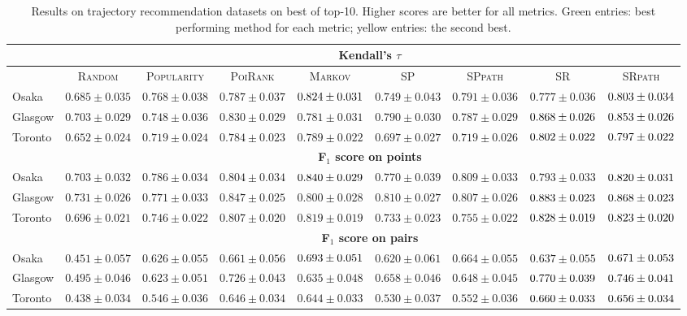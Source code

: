 \begin{table*}[t]
{%
\begin{tabular}{l|cc|ccc|ccc} \hline
& \multicolumn{8}{c}{\bf Kendall's $\tau$} \\ \hline
 & \textsc{Random} & \textsc{Popularity} & \textsc{PoiRank} & \textsc{Markov} & \textsc{SP} & \textsc{SPpath} & \textsc{SR} & \textsc{SRpath} \\ \hline
Osaka & $0.685\pm0.035$ & $0.768\pm0.038$ & $0.787\pm0.037$ & $\cellcolor{green!25}{0.824\pm0.031}$ & $0.749\pm0.043$ & $0.791\pm0.036$ & $0.777\pm0.036$ & $\cellcolor{yellow!25}{0.803\pm0.034}$ \\
Glasgow & $0.703\pm0.029$ & $0.748\pm0.036$ & $0.830\pm0.029$ & $0.781\pm0.031$ & $0.790\pm0.030$ & $0.787\pm0.029$ & $\cellcolor{green!25}{0.868\pm0.026}$ & $\cellcolor{yellow!25}{0.853\pm0.026}$ \\
Toronto & $0.652\pm0.024$ & $0.719\pm0.024$ & $0.784\pm0.023$ & $0.789\pm0.022$ & $0.697\pm0.027$ & $0.719\pm0.026$ & $\cellcolor{green!25}{0.802\pm0.022}$ & $\cellcolor{yellow!25}{0.797\pm0.022}$ \\
\hline
& \multicolumn{8}{c}{\bf F$_1$ score on points} \\ \hline
Osaka & $0.703\pm0.032$ & $0.786\pm0.034$ & $0.804\pm0.034$ & $\cellcolor{green!25}{0.840\pm0.029}$ & $0.770\pm0.039$ & $0.809\pm0.033$ & $0.793\pm0.033$ & $\cellcolor{yellow!25}{0.820\pm0.031}$ \\
Glasgow & $0.731\pm0.026$ & $0.771\pm0.033$ & $0.847\pm0.025$ & $0.800\pm0.028$ & $0.810\pm0.027$ & $0.807\pm0.026$ & $\cellcolor{green!25}{0.883\pm0.023}$ & $\cellcolor{yellow!25}{0.868\pm0.023}$ \\
Toronto & $0.696\pm0.021$ & $0.746\pm0.022$ & $0.807\pm0.020$ & $0.819\pm0.019$ & $0.733\pm0.023$ & $0.755\pm0.022$ & $\cellcolor{green!25}{0.828\pm0.019}$ & $\cellcolor{yellow!25}{0.823\pm0.020}$ \\
\hline
& \multicolumn{8}{c}{\bf F$_1$ score on pairs} \\ \hline
Osaka & $0.451\pm0.057$ & $0.626\pm0.055$ & $0.661\pm0.056$ & $\cellcolor{green!25}{0.693\pm0.051}$ & $0.620\pm0.061$ & $0.664\pm0.055$ & $0.637\pm0.055$ & $\cellcolor{yellow!25}{0.671\pm0.053}$ \\
Glasgow & $0.495\pm0.046$ & $0.623\pm0.051$ & $0.726\pm0.043$ & $0.635\pm0.048$ & $0.658\pm0.046$ & $0.648\pm0.045$ & $\cellcolor{green!25}{0.770\pm0.039}$ & $\cellcolor{yellow!25}{0.746\pm0.041}$ \\
Toronto & $0.438\pm0.034$ & $0.546\pm0.036$ & $0.646\pm0.034$ & $0.644\pm0.033$ & $0.530\pm0.037$ & $0.552\pm0.036$ & $\cellcolor{green!25}{0.660\pm0.033}$ & $\cellcolor{yellow!25}{0.656\pm0.034}$ \\
\hline
\end{tabular}
}
\caption{Results on trajectory recommendation datasets on best of top-10.
Higher scores are better for all metrics. 
Green entries: \colorbox{green!25}{best} performing method for each metric; yellow entries: the \colorbox{yellow!25}{second best}.
}
\label{tab:result}     
\end{table*}
